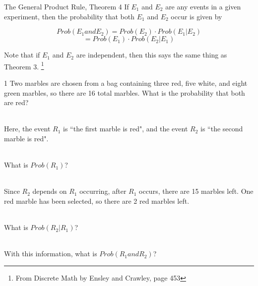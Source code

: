 \documentclass[a4paper,12pt]{book}
\newcounter{question}
\begin{document}
        \newpage

        \begin{intro}{The General Product Rule, Theorem 4}
            If $E_{1}$ and $E_{2}$ are any events in a given experiment, then
            the probability that both $E_{1}$ and $E_{2}$ occur is given by

            $$Prob(E_{1} and E_{2}) = Prob(E_{2}) \cdot Prob(E_{1} | E_{2}) $$
            $$ = Prob(E_{1}) \cdot Prob(E_{2} | E_{1}) $$

            Note that if $E_{1}$ and $E_{2}$ are independent, then this says
            the same thing as Theorem 3.
            \footnote{From Discrete Math by Ensley and Crawley, page 453}
        \end{intro}

        \begin{question}{\thequestion}{1}
            Two marbles are chosen from a bag containing three red, five white, and eight green marbles,
            so there are 16 total marbles.
            What is the probability that both are red?

            ~\\
            Here, the event $R_{1}$ is ``the first marble is red",
            and the event $R_{2}$ is ``the second marble is red".

            ~\\
            What is $Prob(R_{1})$?

            ~\\
            Since $R_{2}$ depends on $R_{1}$ occurring, after $R_{1}$
            occurs, there are 15 marbles left. One red marble
            has been selected, so there are 2 red marbles left.

            ~\\
            What is $Prob(R_{2} | R_{1})$?

            ~\\
            With this information, what is $Prob(R_{1} and R_{2})$?


        \end{question}
\end{document}
